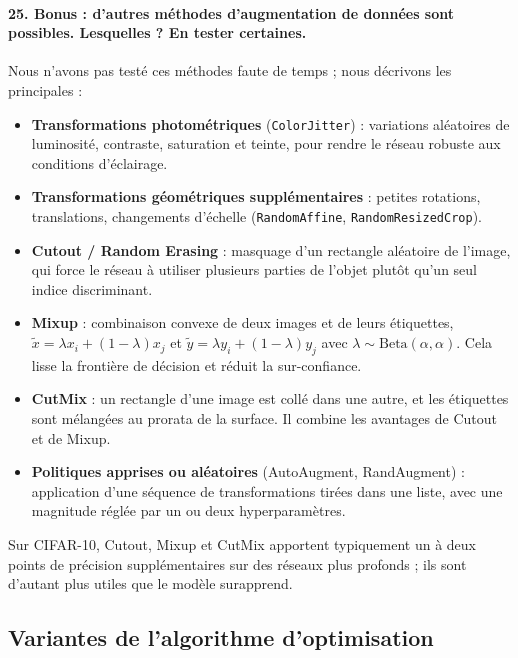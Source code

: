 \documentclass{report}
\begin{document}
\paragraph{25. Bonus : d'autres méthodes d'augmentation de données sont possibles. Lesquelles ? En tester certaines.}
 Nous n'avons pas testé ces méthodes faute de temps ; nous décrivons les principales :
\begin{itemize}
    \item \textbf{Transformations photométriques} (\texttt{ColorJitter}) : variations aléatoires de luminosité, contraste, saturation et teinte, pour rendre le réseau robuste aux conditions d'éclairage.
    \item \textbf{Transformations géométriques supplémentaires} : petites rotations, translations, changements d'échelle (\texttt{RandomAffine}, \texttt{RandomResizedCrop}).
    \item \textbf{Cutout / Random Erasing} : masquage d'un rectangle aléatoire de l'image, qui force le réseau à utiliser plusieurs parties de l'objet plutôt qu'un seul indice discriminant.
    \item \textbf{Mixup} : combinaison convexe de deux images et de leurs étiquettes, $\tilde{x} = \lambda x_i + (1-\lambda) x_j$ et $\tilde{y} = \lambda y_i + (1-\lambda) y_j$ avec $\lambda \sim \text{Beta}(\alpha, \alpha)$. Cela lisse la frontière de décision et réduit la sur-confiance.
    \item \textbf{CutMix} : un rectangle d'une image est collé dans une autre, et les étiquettes sont mélangées au prorata de la surface. Il combine les avantages de Cutout et de Mixup.
    \item \textbf{Politiques apprises ou aléatoires} (AutoAugment, RandAugment) : application d'une séquence de transformations tirées dans une liste, avec une magnitude réglée par un ou deux hyperparamètres.
\end{itemize}
Sur CIFAR-10, Cutout, Mixup et CutMix apportent typiquement un à deux points de précision supplémentaires sur des réseaux plus profonds ; ils sont d'autant plus utiles que le modèle surapprend.

\subsection{Variantes de l'algorithme d'optimisation}
\end{document}
